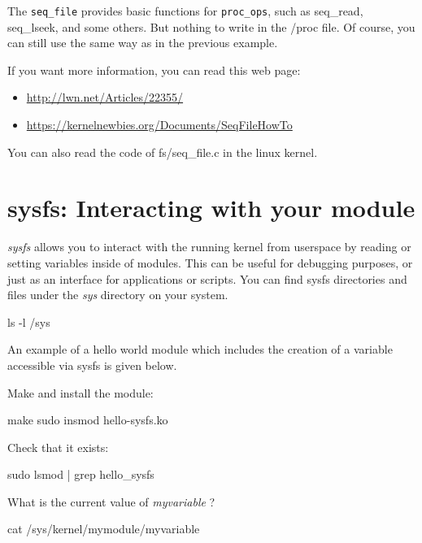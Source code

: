 \documentclass[10pt, oneside]{book}
\begin{document}
The \verb|seq_file| provides basic functions for \verb|proc_ops|, such as seq\_read, seq\_lseek, and some others.
But nothing to write in the /proc file.
Of course, you can still use the same way as in the previous example.


If you want more information, you can read this web page:

\begin{itemize}
  \item \url{http://lwn.net/Articles/22355/}
  \item \url{https://kernelnewbies.org/Documents/SeqFileHowTo}
\end{itemize}

You can also read the code of fs/seq\_file.c in the linux kernel.

\section{sysfs: Interacting with your module}
\label{sec:sysfs}
\emph{sysfs} allows you to interact with the running kernel from userspace by reading or setting variables inside of modules.
This can be useful for debugging purposes, or just as an interface for applications or scripts.
You can find sysfs directories and files under the \emph{sys} directory on your system.

\begin{codebash}
ls -l /sys
\end{codebash}

An example of a hello world module which includes the creation of a variable accessible via sysfs is given below.


Make and install the module:

\begin{codebash}
make
sudo insmod hello-sysfs.ko
\end{codebash}

Check that it exists:

\begin{codebash}
sudo lsmod | grep hello_sysfs
\end{codebash}

What is the current value of \emph{myvariable} ?

\begin{codebash}
cat /sys/kernel/mymodule/myvariable
\end{codebash}
\end{document}
